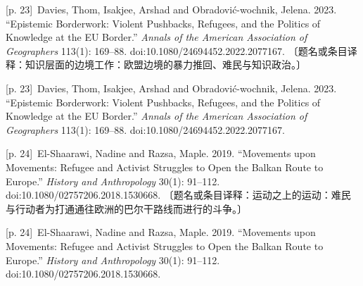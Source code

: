 \documentclass[10pt,a4paper]{article}
\begin{document}
\noindent\begin{minipage}{\textwidth}\begin{minipage}[t]{\dimexpr.5\textwidth-4mm\relax}{\scriptsize\color{gray} [p. 23]}\ Davies, Thom, Isakjee, Arshad and Obradović-wochnik, Jelena. 2023. “Epistemic Borderwork: Violent Pushbacks, Refugees, and the Politics of Knowledge at the EU Border.” \textit{Annals of the American Association of Geographers} 113(1): 169–88. doi:10.1080/24694452.2022.2077167. 〔题名或条目译释：知识层面的边境工作：欧盟边境的暴力推回、难民与知识政治。〕\par\end{minipage}\hfill\begin{minipage}[t]{\dimexpr.5\textwidth-4mm\relax}{\scriptsize\color{gray} [p. 23]}\ Davies, Thom, Isakjee, Arshad and Obradović-wochnik, Jelena. 2023. “Epistemic Borderwork: Violent Pushbacks, Refugees, and the Politics of Knowledge at the EU Border.” \textit{Annals of the American Association of Geographers} 113(1): 169–88. doi:10.1080/24694452.2022.2077167.\par\end{minipage}\end{minipage}\par
\noindent\begin{minipage}{\textwidth}\begin{minipage}[t]{\dimexpr.5\textwidth-4mm\relax}{\scriptsize\color{gray} [p. 24]}\ El-Shaarawi, Nadine and Razsa, Maple. 2019. “Movements upon Movements: Refugee and Activist Struggles to Open the Balkan Route to Europe.” \textit{History and Anthropology} 30(1): 91–112. doi:10.1080/02757206.2018.1530668. 〔题名或条目译释：运动之上的运动：难民与行动者为打通通往欧洲的巴尔干路线而进行的斗争。〕\par\end{minipage}\hfill\begin{minipage}[t]{\dimexpr.5\textwidth-4mm\relax}{\scriptsize\color{gray} [p. 24]}\ El-Shaarawi, Nadine and Razsa, Maple. 2019. “Movements upon Movements: Refugee and Activist Struggles to Open the Balkan Route to Europe.” \textit{History and Anthropology} 30(1): 91–112. doi:10.1080/02757206.2018.1530668.\par\end{minipage}\end{minipage}\par
\end{document}

